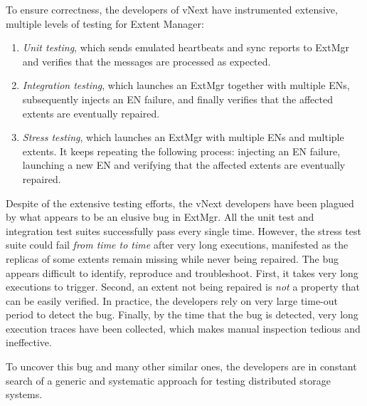 To ensure correctness, the developers of vNext have instrumented extensive, multiple levels of testing for Extent Manager:
\begin{enumerate}
\item \emph{Unit testing}, which sends emulated heartbeats and sync reports to ExtMgr and verifies that the messages are processed as expected.

\item \emph{Integration testing}, which launches an ExtMgr together with multiple ENs, subsequently injects an EN failure, and finally verifies that the affected extents are eventually repaired.

\item \emph{Stress testing}, which launches an ExtMgr with multiple ENs and multiple extents. It keeps repeating the following process: injecting an EN failure, launching a new EN and verifying that the affected extents are eventually repaired.
\end{enumerate}

Despite of the extensive testing efforts, the vNext developers have been plagued by what appears to be an elusive bug in ExtMgr. All the unit test and integration test suites successfully pass every single time. However, the stress test suite could fail {\em from time to time} after very long executions, manifested as the replicas of some extents remain missing while never being repaired. The bug appears difficult to identify, reproduce and troubleshoot. First, it takes very long executions to trigger. Second, an extent not being repaired is {\em not} a property that can be easily verified. In practice, the developers rely on very large time-out period to detect the bug. Finally, by the time that the bug is detected, very long execution traces have been collected, which makes manual inspection tedious and ineffective.

To uncover this bug and many other similar ones, the developers are in constant search of a generic and systematic approach for testing distributed storage systems.

